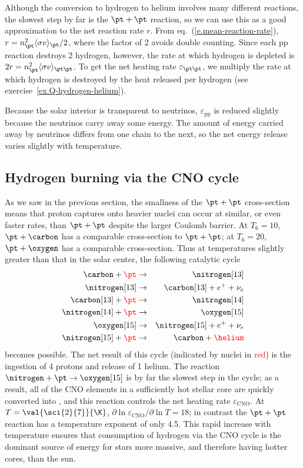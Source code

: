 Although the conversion to hydrogen to helium involves many different reactions, the slowest step by far is the $\pt + \pt$ reaction, so we can use this as a good approximation to the net reaction rate $r$. From eq.~(\ref{e.mean-reaction-rate}), $r = n_{\pt}^{2}\langle\sigma v\rangle_{\pt}/2$, where the factor of 2 avoids double counting. Since each pp reaction destroys 2 hydrogen, however, the rate at which hydrogen is depleted is $2r = n_{\pt}^{2}\langle\sigma v\rangle_{\pt\pt}$. To get the net heating rate $\varepsilon_{\pt\pt}$, we multiply the rate at which hydrogen is destroyed by the heat released per hydrogen (see exercise~\ref{ex.Q-hydrogen-helium}).

Because the solar interior is transparent to neutrinos, $\varepsilon_{\mathrm{pp}}$ is reduced slightly because the neutrinos carry away some energy. The amount of energy carried away by neutrinos differs from one chain to the next, so the net energy release varies slightly with temperature.

\subsection{Hydrogen burning via the CNO cycle}

As we saw in the previous section, the smallness of the $\pt+\pt$ cross-section means that proton captures onto heavier nuclei can occur at similar, or even faster rates, than $\pt+\pt$ despite the larger Coulomb barrier. 
At $T_{6} = 10$, $\pt+\carbon$ has a comparable cross-section to $\pt + \pt$; at $T_{6} = 20$, $\pt+\oxygen$ has a comparable cross-section.
Thus at temperatures slightly greater than that in the solar center, the following catalytic cycle 
\begin{eqnarray*}
\carbon + {\color{red}\pt} &\to& \nitrogen[13]\\
\nitrogen[13] &\to& \carbon[13] + e^{+} + \nu_{e}\\
\carbon[13] + {\color{red}\pt} &\to& \nitrogen[14]\\
\nitrogen[14] + {\color{red}\pt} &\to& \oxygen[15]\\
\oxygen[15] &\to& \nitrogen[15] + e^{+} + \nu_{e}\\
\nitrogen[15] + {\color{red}\pt} &\to& \carbon + {\color{red}\helium}
\end{eqnarray*}
becomes possible.
The net result of this cycle (indicated by nuclei in \textcolor{red}{red}) is the ingestion of 4 protons and release of 1 helium.
The reaction $\nitrogen+\pt\to\oxygen[15]$ is by far the slowest step in the cycle; as a result, all of the CNO elements in a sufficiently hot stellar core are quickly converted into \nitrogen, and this reaction controls the net heating rate $\varepsilon_{\mathrm{CNO}}$. At $T = \val{\sci{2}{7}}{\K}$, $\partial \ln \varepsilon_{\mathrm{CNO}}/\partial\ln T = 18$; in contrast the $\pt+\pt$ reaction has a temperature exponent of only 4.5. This rapid increase with temperature ensures that consumption of hydrogen via the CNO cycle is the dominant source of energy for stars more massive, and therefore having hotter cores, than the sun.


